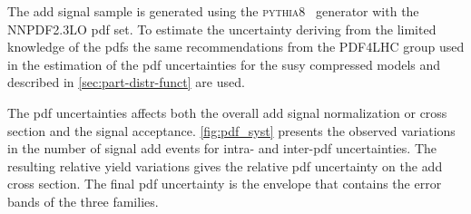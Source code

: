 

The \gls{add} signal sample is generated using the
\textsc{pythia8}~\cite{PYTHIA8} generator with the NNPDF2.3LO \gls{pdf} set. To
estimate the uncertainty deriving from the limited knowledge of the \glspl{pdf}
the same recommendations from the PDF4LHC group used in the estimation of the
\gls{pdf} uncertainties for the \gls{susy} compressed models and described in
\cref{sec:part-distr-funct} are used.

The \gls{pdf} uncertainties affects both the overall \gls{add} signal
normalization or cross section and the signal acceptance. \cref{fig:pdf_syst}
presents the observed variations in the number of signal \gls{add} events for
intra- and inter-\gls{pdf} uncertainties. The resulting relative yield
variations gives the relative \gls{pdf} uncertainty on the \gls{add} cross
section. The final \gls{pdf} uncertainty is the envelope that contains the error
bands of the three families.

